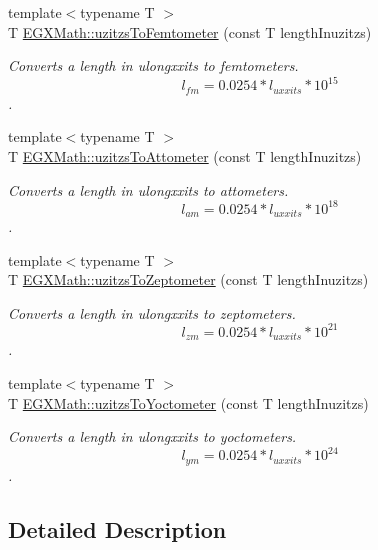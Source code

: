 \begin{DoxyCompactItemize}
{\footnotesize template$<$typename T $>$ }\\T \mbox{\hyperlink{group___e_g_x_math-_conversions-_length_conversions-_imperial-uzitzs-_s_i_ga55b363df9781c5d92c86bcef272dfc7f}{E\+G\+X\+Math\+::uzitzs\+To\+Femtometer}} (const T length\+Inuzitzs)
\begin{DoxyCompactList}\small\item\em Converts a length in ulongxxits to femtometers. \[ l_{fm}=0.0254 * l_{uxxits} * 10^{15} \]. \end{DoxyCompactList}\item 
{\footnotesize template$<$typename T $>$ }\\T \mbox{\hyperlink{group___e_g_x_math-_conversions-_length_conversions-_imperial-uzitzs-_s_i_ga33c3f00e9fadcd52f2c0bfbd71a33d2b}{E\+G\+X\+Math\+::uzitzs\+To\+Attometer}} (const T length\+Inuzitzs)
\begin{DoxyCompactList}\small\item\em Converts a length in ulongxxits to attometers. \[ l_{am}=0.0254 * l_{uxxits} * 10^{18} \]. \end{DoxyCompactList}\item 
{\footnotesize template$<$typename T $>$ }\\T \mbox{\hyperlink{group___e_g_x_math-_conversions-_length_conversions-_imperial-uzitzs-_s_i_ga9057f57c3f49216e6272c6f0f29ded62}{E\+G\+X\+Math\+::uzitzs\+To\+Zeptometer}} (const T length\+Inuzitzs)
\begin{DoxyCompactList}\small\item\em Converts a length in ulongxxits to zeptometers. \[ l_{zm}=0.0254 * l_{uxxits} * 10^{21} \]. \end{DoxyCompactList}\item 
{\footnotesize template$<$typename T $>$ }\\T \mbox{\hyperlink{group___e_g_x_math-_conversions-_length_conversions-_imperial-uzitzs-_s_i_gae0faf7639d852bfde8863b3615aa096a}{E\+G\+X\+Math\+::uzitzs\+To\+Yoctometer}} (const T length\+Inuzitzs)
\begin{DoxyCompactList}\small\item\em Converts a length in ulongxxits to yoctometers. \[ l_{ym}=0.0254 * l_{uxxits} * 10^{24} \]. \end{DoxyCompactList}\end{DoxyCompactItemize}


\subsection{Detailed Description}


